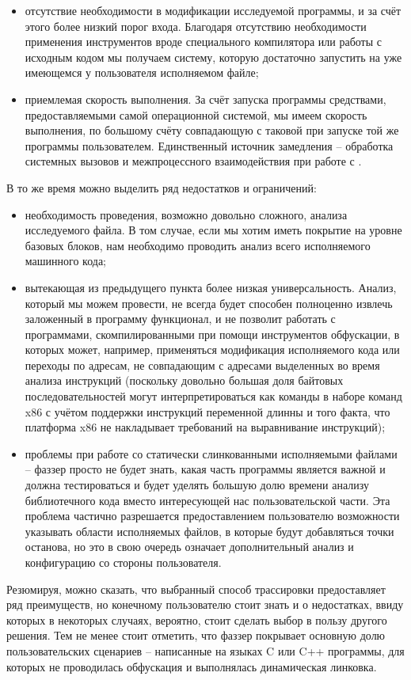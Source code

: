 \begin{itemize}
	\item отсутствие необходимости в модификации исследуемой программы, и за счёт этого более низкий порог входа. Благодаря отсутствию необходимости применения инструментов вроде специального компилятора или работы с исходным кодом мы получаем систему, которую достаточно запустить на уже имеющемся у пользователя исполняемом файле;
	
	\item приемлемая скорость выполнения. За счёт запуска программы средствами, предоставляемыми самой операционной системой, мы имеем скорость выполнения, по большому счёту совпадающую с таковой при запуске той же программы пользователем. Единственный источник замедления -- обработка системных вызовов и межпроцессного взаимодействия при работе с .
\end{itemize}

В то же время можно выделить ряд недостатков и ограничений:

\begin{itemize}
	\item необходимость проведения, возможно довольно сложного, анализа исследуемого файла. В том случае, если мы хотим иметь покрытие на уровне базовых блоков, нам необходимо проводить анализ всего исполняемого машинного кода;
	
	\item вытекающая из предыдущего пункта более низкая универсальность. Анализ, который мы можем провести, не всегда будет способен полноценно извлечь заложенный в программу функционал, и не позволит работать с программами, скомпилированными при помощи инструментов обфускации, в которых может, например, применяться модификация исполняемого кода или переходы по адресам, не совпадающим с адресами выделенных во время анализа инструкций (поскольку довольно большая доля байтовых последовательностей могут интерпретироваться как команды в наборе команд x86 с учётом поддержки инструкций переменной длинны и того факта, что платформа x86 не накладывает требований на выравнивание инструкций);
	
	\item проблемы при работе со статически слинкованными исполняемыми файлами -- фаззер просто не будет знать, какая часть программы является важной и должна тестироваться и будет уделять большую долю времени анализу библиотечного кода вместо интересующей нас пользовательской части. Эта проблема частично разрешается предоставлением пользователю возможности указывать области исполняемых файлов, в которые будут добавляться точки останова, но это в свою очередь означает дополнительный анализ и конфигурацию со стороны пользователя.
\end{itemize}

Резюмируя, можно сказать, что выбранный способ трассировки предоставляет ряд преимуществ, но конечному пользователю стоит знать и о недостатках, ввиду которых в некоторых случаях, вероятно, стоит сделать выбор в пользу другого решения. Тем не менее стоит отметить, что фаззер покрывает основную долю пользовательских сценариев -- написанные на языках C или C++ программы, для которых не проводилась обфускация и выполнялась динамическая линковка.